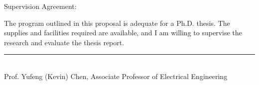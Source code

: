 \documentclass{article}
\begin{document}
\vspace{1em}
\noindent Supervision Agreement:

\vspace{1em}
\begin{minipage}{\dimexpr\textwidth-1cm}
\noindent The program outlined in this proposal is adequate for a Ph.D. thesis. The
supplies and facilities required are available, and I am willing to supervise
the research and evaluate the thesis report.
\end{minipage}

\vspace{2em}
\begin{flushright}
    \rule{0.7\linewidth}{0.1pt}\\
    {\normalsize Prof. Yufeng (Kevin) Chen, Associate Professor of Electrical Engineering}
\end{flushright}

\restoregeometry

\endgroup

\newpage

\maketitle













\end{document}

